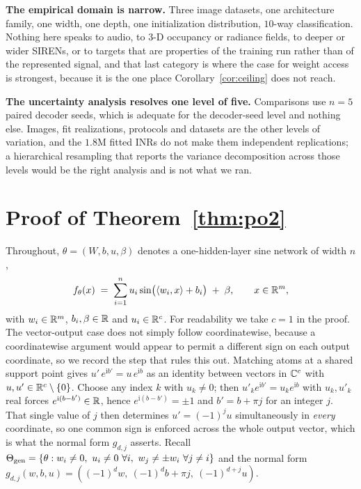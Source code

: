 \textbf{The empirical domain is narrow.} Three image datasets, one architecture family, one width,
one depth, one initialization distribution, $10$-way classification. Nothing here speaks to audio,
to 3-D occupancy or radiance fields, to deeper or wider SIRENs, or to targets that are properties of
the training run rather than of the represented signal, and that last category is where the case
for weight access is strongest, because it is the one place Corollary~\ref{cor:ceiling} does not
reach.

\textbf{The uncertainty analysis resolves one level of five.} Comparisons use $n=5$ paired decoder
seeds, which is adequate for the decoder-seed level and nothing else. Images, fit realizations,
protocols and datasets are the other levels of variation, and the $1.8$M fitted INRs do not make
them independent replications; a hierarchical resampling that reports the variance decomposition
across those levels would be the right analysis and is not what we ran.


\section{Proof of Theorem~\ref{thm:po2}}\label{app:po2}

Throughout, $\theta = (W,b,u,\beta)$ denotes a one-hidden-layer sine network of width $n$,
\begin{equation}
f_\theta(x) \;=\; \sum_{i=1}^{n} u_i \sin\!\big(\langle w_i, x\rangle + b_i\big) \;+\; \beta,
\qquad x \in \mathbb{R}^m,
\label{eq:app-l1}
\end{equation}
with $w_i \in \mathbb{R}^m$, $b_i,\beta \in \mathbb{R}$ and $u_i \in \mathbb{R}^c$. For readability we take $c=1$ in the
proof. The vector-output case does not simply follow coordinatewise, because a coordinatewise
argument would appear to permit a different sign on each output coordinate, so we record the step
that rules this out. Matching atoms at a shared support point gives $u'\,e^{\mathrm i b'} =
u\,e^{\mathrm i b}$ as an identity between vectors in $\mathbb{C}^c$ with $u, u' \in \mathbb{R}^c \setminus
\{0\}$. Choose any index $k$ with $u_k \ne 0$; then $u'_k e^{\mathrm i b'} = u_k e^{\mathrm i b}$
with $u_k, u'_k$ real forces $e^{\mathrm i (b - b')} \in \mathbb{R}$, hence $e^{\mathrm i (b-b')} = \pm 1$
and $b' = b + \pi j$ for an integer $j$. That single value of $j$ then determines
$u' = (-1)^{j} u$ simultaneously in \emph{every} coordinate, so one common sign is enforced across
the whole output vector, which is what the normal form $g_{d,j}$ asserts. Recall
$\Theta_{\mathrm{gen}} = \{\theta : w_i \neq 0,\ u_i \neq 0\ \forall i,\ w_j \neq \pm w_i\ \forall j \neq i\}$ and
the normal form $g_{d,j}(w,b,u) = ((-1)^d w,\ (-1)^d b + \pi j,\ (-1)^{d+j}u)$.

